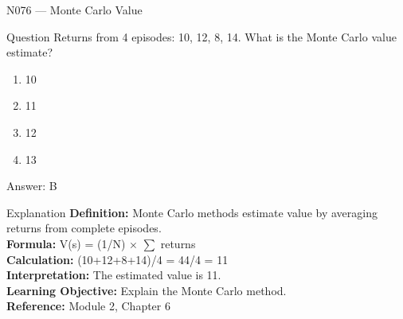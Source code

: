 \documentclass[aspectratio=169,8pt]{beamer}
\begin{document}
	\begin{frame}{N076 --- Monte Carlo Value}
		\begin{block}{Question}
			Returns from 4 episodes: 10, 12, 8, 14. What is the Monte Carlo value estimate?
			\begin{enumerate}
				\item 10
				\item 11
				\item 12
				\item 13
			\end{enumerate}
		\end{block}
		\begin{exampleblock}{Answer: B}\end{exampleblock}
		\begin{block}{Explanation}
			\textbf{Definition:} Monte Carlo methods estimate value by averaging returns from complete episodes.\\
			\textbf{Formula:} V(s) = (1/N) $\times$ $\sum$ returns\\
			\textbf{Calculation:} (10+12+8+14)/4 = 44/4 = 11\\
			\textbf{Interpretation:} The estimated value is 11.\\
			\textbf{Learning Objective:} Explain the Monte Carlo method.\\
			\textbf{Reference:} Module 2, Chapter 6
		\end{block}
	\end{frame}
	
\end{document}
